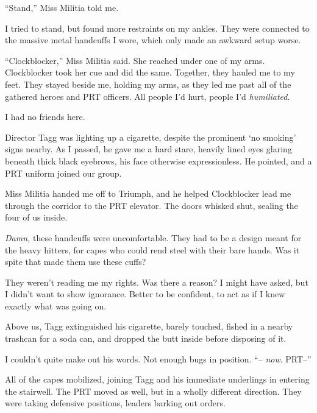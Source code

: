 ``Stand,'' Miss Militia told me.



I tried to stand, but found more restraints on my ankles.  They were connected to the massive metal handcuffs I wore, which only made an awkward setup worse.



``Clockblocker,'' Miss Militia said.  She reached under one of my arms.  Clockblocker took her cue and did the same.  Together, they hauled me to my feet.  They stayed beside me, holding my arms, as they led me past all of the gathered heroes and PRT officers.  All people I'd hurt, people I'd \emph{humiliated}.



I had no friends here.



Director Tagg was lighting up a cigarette, despite the prominent `no smoking' signs nearby.  As I passed, he gave me a hard stare, heavily lined eyes glaring beneath thick black eyebrows, his face otherwise expressionless.  He pointed, and a PRT uniform joined our group.



Miss Militia handed me off to Triumph, and he helped Clockblocker lead me through the corridor to the PRT elevator.  The doors whisked shut, sealing the four of us inside.



\emph{Damn, }these handcuffs were uncomfortable.  They had to be a design meant for the heavy hitters, for capes who could rend steel with their bare hands.  Was it spite that made them use these cuffs?



They weren't reading me my rights.  Was there a reason?  I might have asked, but I didn't want to show ignorance.  Better to be confident, to act as if I knew exactly what was going on.



Above us, Tagg extinguished his cigarette, barely touched, fished in a nearby trashcan for a soda can, and dropped the butt inside before disposing of it.



I couldn't quite make out his words.  Not enough bugs in position.  ``-- \emph{now}.  PRT--''



All of the capes mobilized, joining Tagg and his immediate underlings in entering the stairwell.  The PRT moved as well, but in a wholly different direction.  They were taking defensive positions, leaders barking out orders.



